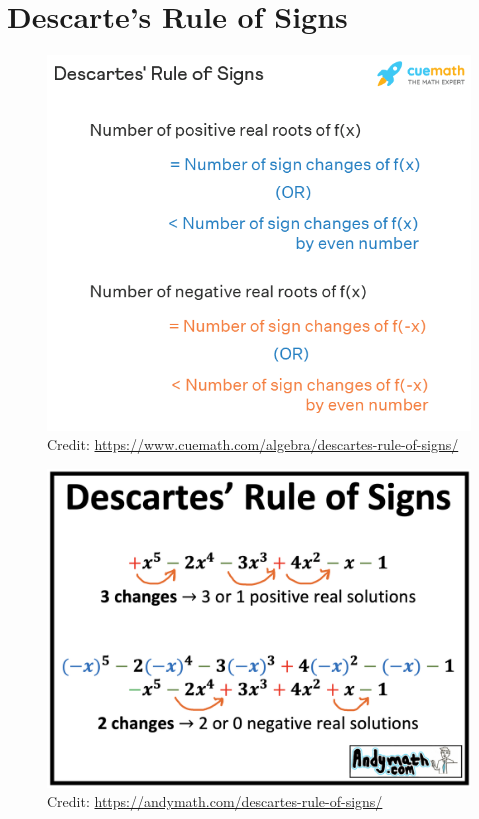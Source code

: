 \documentclass[12pt]{article}
\begin{document}
\section{Descarte's Rule of Signs}

\begin{figure}[H]
	\centering
	\includegraphics[scale=0.6]{drs.png}
	\caption{Credit: \url{https://www.cuemath.com/algebra/descartes-rule-of-signs/}}
\end{figure}

\begin{figure}[H]
	\centering
	\includegraphics[scale=0.3]{drs2.png}
	\caption{Credit: \url{https://andymath.com/descartes-rule-of-signs/}}
\end{figure}

\section{}
\end{document}
